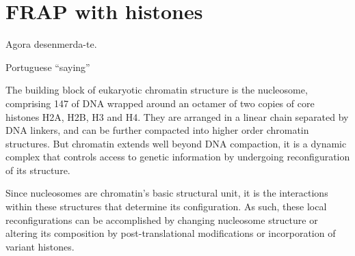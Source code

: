 \chapter{FRAP with histones}
\label{ch:frap}

\epigraph{Agora desenmerda-te.}{Portuguese ``saying''}



The building block of eukaryotic chromatin structure is the nucleosome, comprising
\SI{147}{\bp} of DNA wrapped around an octamer of two copies of core histones H2A,
H2B, H3 and H4. They are arranged in a linear chain separated by DNA linkers, and
can be further compacted into higher order chromatin structures. But chromatin extends
well beyond DNA compaction, it is a dynamic complex that controls access to genetic
information by undergoing reconfiguration of its structure.

Since nucleosomes are chromatin's basic structural unit, it is the interactions
within these structures that determine its configuration. As such, these local
reconfigurations can be accomplished by changing nucleosome structure or altering
its composition by post-translational modifications or incorporation of variant
histones.

